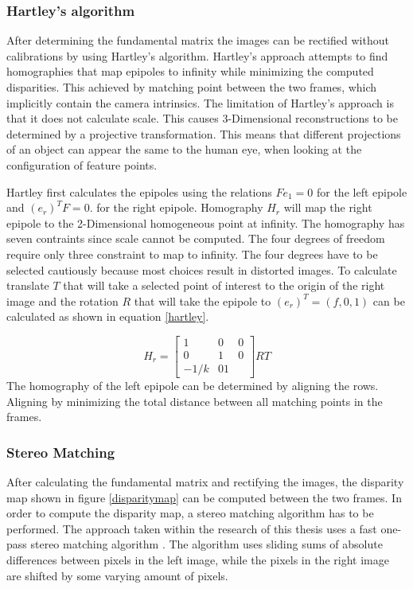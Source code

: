 \documentclass[a4paper]{article}
\begin{document}
\subsubsection{Hartley's algorithm}
After determining the fundamental matrix the images can be rectified without calibrations by using Hartley's algorithm. Hartley's approach attempts to find homographies \cite{Trucco1998} that map epipoles to infinity while minimizing the computed disparities. This achieved by matching point between the two frames, which implicitly contain the camera intrinsics. The limitation of Hartley's approach is that it does not calculate scale. This causes 3-Dimensional reconstructions to be determined by a projective transformation. This means 
that different projections of an object can appear the same to the human eye, when looking at the configuration of feature points.

Hartley first calculates the epipoles using the relations $Fe_1 = 0$ for the left epipole and $(e_r)^T F = 0$. for the right epipole. Homography $H_r$ will map the right epipole to the 2-Dimensional homogeneous point at infinity. The homography has seven contraints since scale cannot be computed. The four degrees of freedom require only three constraint to map to infinity. The four degrees have to be selected cautiously because most choices result in distorted images. 
To calculate translate $T$ that will take a selected point of interest to the origin of the right image and the rotation $R$ that will take the epipole to $(e_r)^T = ( f,0,1)$ can be calculated as shown in equation \ref{hartley}.

\begin{equation}
\label{hartley}
H_r = \begin{bmatrix}
1 & 0 & 0\\
0 & 1 & 0\\
-1/k & 0 1
\end{bmatrix}RT
\end{equation}
The homography of the left epipole can be determined by aligning the rows. Aligning by minimizing the total distance between all matching points in the frames.

\subsubsection{Stereo Matching}
After calculating the fundamental matrix and rectifying the images, the disparity map shown in figure \ref{disparitymap} can be computed between the two frames. In order to compute the disparity map, a stereo matching algorithm has to be performed. The approach taken within the research of this thesis uses a fast one-pass stereo matching algorithm \cite{Gutmann2000}. The algorithm uses sliding sums of absolute differences between pixels in the left image, while the pixels in the right image are shifted by some varying amount of pixels.
\end{document}
